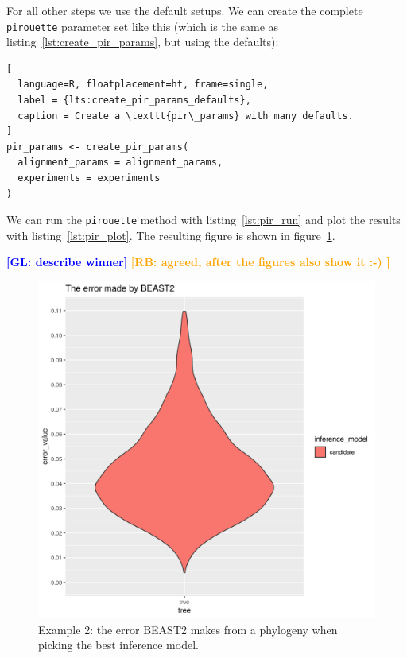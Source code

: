 \documentclass{article}
\newcommand{\giovanni}[1]{\textcolor{blue}{\textbf{[GL: #1]}}}
\newcommand{\richel}[1]{\textcolor{orange}{\textbf{[RB: #1]}}}
\begin{document}
For all other steps we use the default setups. 
We can create the complete
\verb;pirouette; parameter set like this (which is the
same as listing~\ref{lst:create_pir_params}, but using the defaults):

\begin{lstlisting}[
  language=R, floatplacement=ht, frame=single,
  label = {lts:create_pir_params_defaults},
  caption = Create a \texttt{pir\_params} with many defaults.
]
pir_params <- create_pir_params(
  alignment_params = alignment_params,
  experiments = experiments
)
\end{lstlisting}

We can run the \verb;pirouette; method with listing~\ref{lst:pir_run}
and plot the results with listing~\ref{lst:pir_plot}.
The resulting figure is shown in figure~\ref{fig:example_2}.

\giovanni{describe winner}
\richel{agreed, after the figures also show it :-) }

\begin{figure}[ht]
  \includegraphics[width=\textwidth]{example_2_errors.png}
  \caption{
    Example 2: the error BEAST2 makes from a phylogeny when
    picking the best inference model.
  }
  \label{fig:example_2}
\end{figure}

\end{document}
